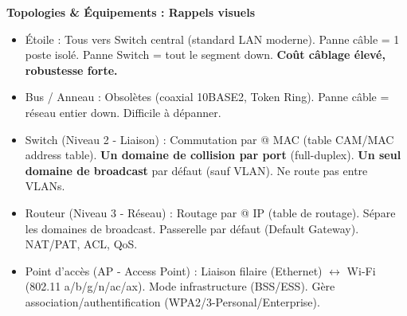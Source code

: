 \documentclass[11pt]{article}
\newcommand{\cle}[1]{{\popxbold\color{popdark}#1}}
\begin{document}
\begin{aretenir}
\textbf{Topologies \& Équipements : Rappels visuels}
\begin{itemize}
    \item \cle{Étoile} : Tous vers Switch central (standard LAN moderne). Panne câble = 1 poste isolé. Panne Switch = tout le segment down. \textbf{Coût câblage élevé, robustesse forte.}
    \item \cle{Bus / Anneau} : Obsolètes (coaxial 10BASE2, Token Ring). Panne câble = réseau entier down. Difficile à dépanner.
    \item \cle{Switch (Niveau 2 - Liaison)} : Commutation par @ MAC (table CAM/MAC address table). \textbf{Un domaine de collision par port} (full-duplex). \textbf{Un seul domaine de broadcast} par défaut (sauf VLAN). Ne route pas entre VLANs.
    \item \cle{Routeur (Niveau 3 - Réseau)} : Routage par @ IP (table de routage). Sépare les domaines de broadcast. Passerelle par défaut (Default Gateway). NAT/PAT, ACL, QoS.
    \item \cle{Point d'accès (AP - Access Point)} : Liaison filaire (Ethernet) $\leftrightarrow$ Wi-Fi (802.11 a/b/g/n/ac/ax). Mode infrastructure (BSS/ESS). Gère association/authentification (WPA2/3-Personal/Enterprise).
\end{itemize}

\end{aretenir}
\end{document}
